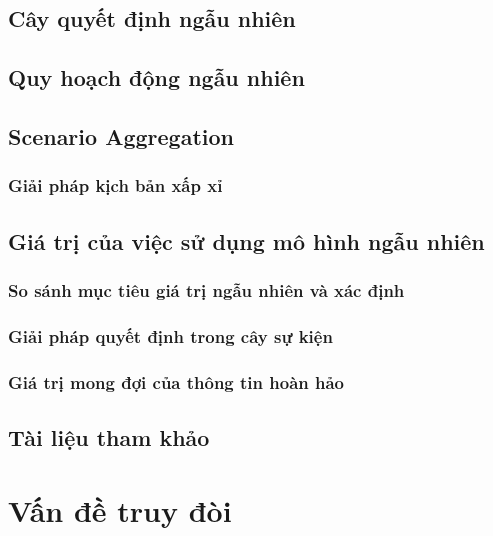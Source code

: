 \documentclass[12pt,a4paper]{report}
\begin{document}
	\section{Cây quyết định ngẫu nhiên}
	
	\section{Quy hoạch động ngẫu nhiên}
	
	\section{Scenario Aggregation}
	\subsection{Giải pháp kịch bản xấp xỉ}
	\section{Giá trị của việc sử dụng mô hình ngẫu nhiên}
	\subsection{So sánh mục tiêu giá trị ngẫu nhiên và xác định}
	\subsection{Giải pháp quyết định trong cây sự kiện}
	\subsection{Giá trị mong đợi của thông tin hoàn hảo}
	
	
	\section{Tài liệu tham khảo}
	
	
	
	
	
	
	
	
	
	\chapter{Vấn đề truy đòi}
\end{document}
